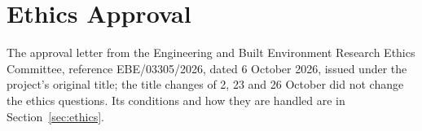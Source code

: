 \chapter{Ethics Approval}
\label{app:ethics}

The approval letter from the Engineering and Built Environment Research Ethics Committee, reference EBE/03305/2026, dated 6 October 2026, issued under the project's original title; the title changes of 2, 23 and 26 October did not change the ethics questions. Its conditions and how they are handled are in Section~\ref{sec:ethics}.


